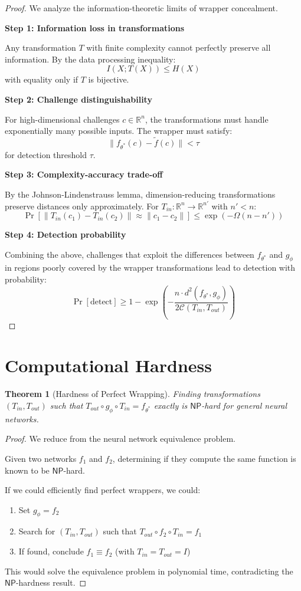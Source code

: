 \documentclass[11pt]{article}
\theoremstyle{plain}
\newtheorem{theorem}{Theorem}
\begin{document}
\begin{proof}
We analyze the information-theoretic limits of wrapper concealment.

\textbf{Step 1: Information loss in transformations}

Any transformation $T$ with finite complexity cannot perfectly preserve all 
information. By the data processing inequality:
$$I(X; T(X)) \leq H(X)$$
with equality only if $T$ is bijective.

\textbf{Step 2: Challenge distinguishability}

For high-dimensional challenges $c \in \mathbb{R}^n$, the transformations 
must handle exponentially many possible inputs. The wrapper must satisfy:
$$\|f_{\theta^*}(c) - \tilde{f}(c)\| < \tau$$
for detection threshold $\tau$.

\textbf{Step 3: Complexity-accuracy trade-off}

By the Johnson-Lindenstrauss lemma, dimension-reducing transformations 
preserve distances only approximately. For $T_{in}: \mathbb{R}^n \rightarrow 
\mathbb{R}^{n'}$ with $n' < n$:
$$\Pr[\|T_{in}(c_1) - T_{in}(c_2)\| \approx \|c_1 - c_2\|] \leq \exp(-\Omega(n - n'))$$

\textbf{Step 4: Detection probability}

Combining the above, challenges that exploit the differences between 
$f_{\theta^*}$ and $g_{\phi}$ in regions poorly covered by the wrapper 
transformations lead to detection with probability:
$$\Pr[\text{detect}] \geq 1 - \exp\left(-\frac{n \cdot d^2(f_{\theta^*}, g_{\phi})}{2\mathcal{C}(T_{in}, T_{out})}\right)$$
\end{proof}

\section{Computational Hardness}

\begin{theorem}[Hardness of Perfect Wrapping]
\label{thm:wrapper-hardness}
Finding transformations $(T_{in}, T_{out})$ such that 
$T_{out} \circ g_{\phi} \circ T_{in} = f_{\theta^*}$ exactly is 
$\mathsf{NP}$-hard for general neural networks.
\end{theorem}

\begin{proof}
We reduce from the neural network equivalence problem.

Given two networks $f_1$ and $f_2$, determining if they compute the same 
function is known to be $\mathsf{NP}$-hard. 

If we could efficiently find perfect wrappers, we could:
\begin{enumerate}
\item Set $g_{\phi} = f_2$
\item Search for $(T_{in}, T_{out})$ such that $T_{out} \circ f_2 \circ T_{in} = f_1$
\item If found, conclude $f_1 \equiv f_2$ (with $T_{in} = T_{out} = I$)
\end{enumerate}

This would solve the equivalence problem in polynomial time, contradicting 
the $\mathsf{NP}$-hardness result.
\end{proof}
\end{document}
